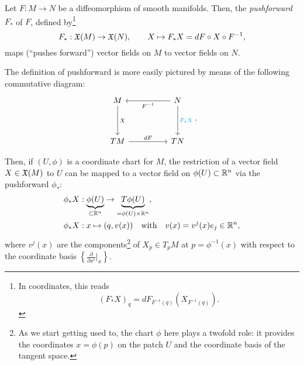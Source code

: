 \begin{definition}
  Let $F:M\to N$ be a diffeomorphism of smooth manifolds.
  Then, the \emph{pushforward} $F_*$ of $F$, defined by\footnote{In coordinates, this reads\begin{equation}
      (F_* X)_q = dF_{F^{-1}(q)}(X_{F^{-1}(q)}).
    \end{equation}}
  \begin{equation}
    F_*: \mathfrak{X}(M) \to \mathfrak{X}(N),\qquad
    X \mapsto F_* X = d F \circ X \circ F^{-1},
  \end{equation}
  maps (``pushes forward'') vector fields on $M$ to vector fields on $N$.
\end{definition}

The definition of pushforward is more easily pictured by means of the following commutative diagram:
\begin{equation}
  \begin{tikzcd}[row sep=huge, column sep=huge]
    M \arrow[d, "X"]
    & N \arrow[l, "F^{-1}"] \arrow[d, "F_*X" cyan]\\
    TM \arrow[r, "d F"]
    & TN
  \end{tikzcd}.
\end{equation}

Then, if $(U, \phi)$ is a coordinate chart for $M$, the restriction of a vector field $X\in\mathfrak{X}(M)$ to $U$ can be mapped to a vector field on $\phi(U)\subset\mathbb{R}^n$ via the pushforward $\phi_*$:
\begin{align}
  \phi_* X & : \LaTeXunderbrace{\phi(U)}_{\subset\R^n} \to \LaTeXunderbrace{T \phi(U)}_{=\phi(U)\times\R^n}, \\
  \phi_* X & : x\mapsto (q,v(x)) \quad\mbox{with}\quad v(x) = v^j(x)e_j \in \R^n,
\end{align}
where $v^j(x)$ are the components\footnote{As we start getting used to, the chart $\phi$ here plays a twofold role: it provides the coordinates $x=\phi(p)$ on the patch $U$ and the coordinate basis of the tangent space.} of $X_p\in T_p M$ at $p=\phi^{-1}(x)$ with respect to the coordinate basis $\left\{\frac{\partial}{\partial x^i}\big|_x\right\}$.



